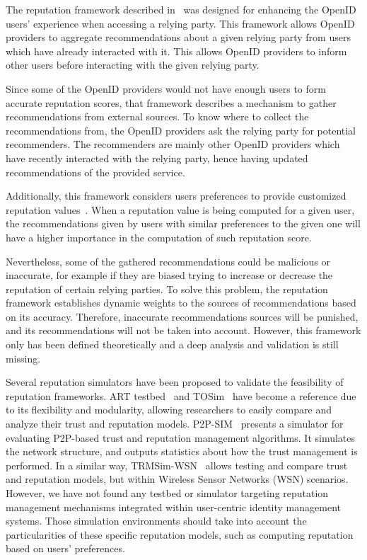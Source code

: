 \documentclass{llncs}
\begin{document}
The reputation framework described in~\cite{idm-trm:2011:gomez-marmol:atc} was designed for enhancing the OpenID users' experience when accessing a relying party. This framework allows OpenID providers to aggregate recommendations about a given relying party from users which have already interacted with it. This allows OpenID providers to inform other users before interacting with the given relying party. 

Since some of the OpenID providers would not have enough users to form accurate reputation scores, that framework describes a mechanism to gather recommendations from external sources. To know where to collect the recommendations from, the OpenID providers ask the relying party for potential recommenders. The recommenders are mainly other OpenID providers which have recently interacted with the relying party, hence having updated recommendations of the provided service.

Additionally, this framework considers users preferences to provide customized reputation values~\cite{trt:2007:ziegler:dss}. When a reputation value is being computed for a given user, the recommendations given by users with similar preferences to the given one will have a higher importance in the computation of such reputation score.

Nevertheless, some of the gathered recommendations could be malicious or inaccurate, for example if they are biased trying to increase or decrease the reputation of certain relying parties. To solve this problem, the reputation framework establishes dynamic weights to the sources of recommendations based on its accuracy. Therefore, inaccurate recommendations sources will be punished, and its recommendations will not be taken into account. However, this framework only has been defined theoretically and a deep analysis and validation is still missing.

Several reputation simulators have been proposed to validate the feasibility of reputation frameworks. ART testbed~\cite{trm-sim:2006:fullan:itrust} and TOSim~\cite{trm-sim:2007:zhang:iccs} have become a reference due to its flexibility and modularity, allowing researchers to easily compare and analyze their trust and reputation models. P2P-SIM~\cite{trm-sim:2010:west:igi-global} presents a simulator for evaluating P2P-based trust and reputation management algorithms. It simulates the network structure, and outputs statistics about how the trust management is performed. In a similar way, TRMSim-WSN~\cite{trm-sim:2009:gomez-marmol:ieee-icc} allows testing and compare trust and reputation models, but within Wireless Sensor Networks (WSN) scenarios. However, we have not found any testbed or simulator targeting reputation management mechanisms integrated within user-centric identity management systems. Those simulation environments should take into account the particularities of these specific reputation models, such as computing reputation based on users' preferences.
\end{document}
